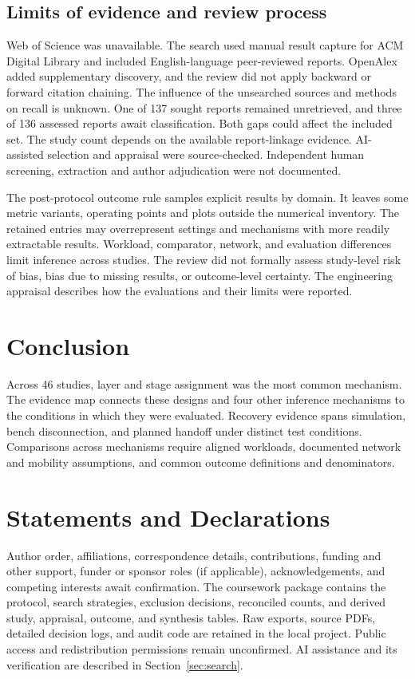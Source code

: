 \documentclass[pdflatex,sn-vancouver-num]{sn-jnl}
\begin{document}
\subsection{Limits of evidence and review process}\label{sec:limits}
Web of Science was unavailable. The search used manual result capture for ACM Digital Library and included English-language peer-reviewed reports. OpenAlex added supplementary discovery, and the review did not apply backward or forward citation chaining. The influence of the unsearched sources and methods on recall is unknown. One of 137 sought reports remained unretrieved, and three of 136 assessed reports await classification. Both gaps could affect the included set. The study count depends on the available report-linkage evidence. AI-assisted selection and appraisal were source-checked. Independent human screening, extraction and author adjudication were not documented.

The post-protocol outcome rule samples explicit results by domain. It leaves some metric variants, operating points and plots outside the numerical inventory. The retained entries may overrepresent settings and mechanisms with more readily extractable results. Workload, comparator, network, and evaluation differences limit inference across studies. The review did not formally assess study-level risk of bias, bias due to missing results, or outcome-level certainty. The engineering appraisal describes how the evaluations and their limits were reported.

\section{Conclusion}\label{sec:conclusion}
Across 46 studies, layer and stage assignment was the most common mechanism. The evidence map connects these designs and four other inference mechanisms to the conditions in which they were evaluated. Recovery evidence spans simulation, bench disconnection, and planned handoff under distinct test conditions. Comparisons across mechanisms require aligned workloads, documented network and mobility assumptions, and common outcome definitions and denominators.

\section*{Statements and Declarations}\label{sec:declarations}
Author order, affiliations, correspondence details, contributions, funding and other support, funder or sponsor roles (if applicable), acknowledgements, and competing interests await confirmation. The coursework package contains the protocol, search strategies, exclusion decisions, reconciled counts, and derived study, appraisal, outcome, and synthesis tables. Raw exports, source PDFs, detailed decision logs, and audit code are retained in the local project. Public access and redistribution permissions remain unconfirmed. AI assistance and its verification are described in Section~\ref{sec:search}.
\end{document}
